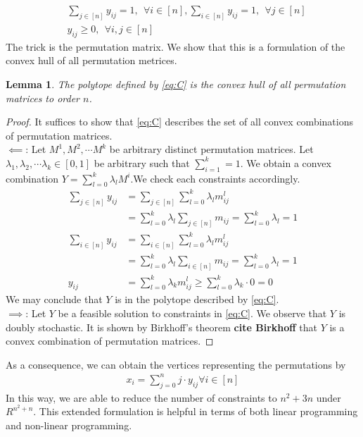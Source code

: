 \documentclass[12pt,letterpaper]{article}
\newtheorem{lemma}[theorem]{Lemma}
\begin{document}
\begin{align}
    &\sum_{j \in [n]} y_{ij} = 1, \ \ \forall i \in [n], \sum_{i \in [n]} y_{ij} = 1, \ \ \forall j \in[n] \label{eq:C} \tag{C} \\ 
    &y_{ij} \geq 0, \ \ \forall i, j \in [n] \nonumber 
\end{align}
The trick is the permutation matrix. We show that this is a formulation of the 
convex hull of all permutation metrices.
\begin{lemma}
    The polytope defined by \ref{eq:C} is the convex hull of all permutation matrices to order $n$.
\end{lemma}
\begin{proof}
    It suffices to show that \ref{eq:C} describes the set of all convex combinations of permutation matrices. \\
    $\impliedby$: Let $M^1, M^2, \cdots M^k$ be arbitrary distinct permutation matrices. Let $\lambda_1, \lambda_2, \cdots \lambda_k \in [0, 1]$ be arbitrary
    such that $\sum_{i=1}^k = 1$.
    We obtain a convex combination $Y = \sum_{l = 0}^k \lambda_l M^i$.We check each constraints accordingly. 
    \begin{align*}
    \sum_{j \in [n]} y_{ij} &= \sum_{j \in [n]} \sum_{l = 0}^k \lambda_l m_{ij}^l \\
    &= \sum_{l = 0}^k \lambda_l \sum_{j \in [n]} m_{ij} = \sum_{l = 0}^k \lambda_l = 1 \\ 
    \sum_{i \in [n]} y_{ij} &= \sum_{i \in [n]} \sum_{l = 0}^k \lambda_l m_{ij}^l \\
    &= \sum_{l = 0}^k \lambda_l \sum_{i \in [n]} m_{ij} = \sum_{l = 0}^k \lambda_l = 1 \\ 
    y_{ij} &= \sum_{l = 0}^k \lambda_k m_{ij}^l \geq \sum_{l = 0}^k \lambda_k \cdot 0  = 0 
    \end{align*}
    We may conclude that $Y$ is in the polytope described by \ref{eq:C}. \\
    $\implies$: Let $Y$ be a feasible solution to constraints in \ref{eq:C}. 
    We observe that $Y$ is doubly stochastic. It is shown by Birkhoff's theorem \textbf{cite Birkhoff} that 
    $Y$ is a convex combination of permutation matrices. 
\end{proof}

As a consequence, we can obtain the vertices representing the permutations by 
\begin{align*}
    x_i = \sum_{j = 0}^n j \cdot y_{ij} \forall i \in[n]
\end{align*}
In this way, we are able to reduce the number of constraints to $n^2 + 3n$ under $R^{n^2 + n}$.
This extended formulation is helpful in terms of both linear programming and non-linear programming. 
\end{document}
